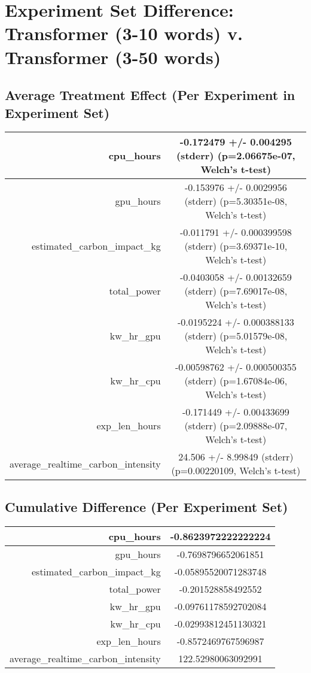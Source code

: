 \documentclass{article}%
\begin{document}
%
\normalsize%
\section{Experiment Set Difference: Transformer (3{-}10 words) v. Transformer (3{-}50 words)}%
\label{sec:Experiment Set Difference Transformer (3{-}10 words) v. Transformer (3{-}50 words)}%
\subsection{Average Treatment Effect (Per Experiment in Experiment Set)}%
\label{subsec:Average Treatment Effect (Per Experiment in Experiment Set)}%
\begin{tabular}{|r|c|}%
\hline%
cpu\_hours&{-}0.172479 +/{-} 0.004295 (stderr) (p=2.06675e{-}07, Welch's t{-}test)\\%
\hline%
gpu\_hours&{-}0.153976 +/{-} 0.0029956 (stderr) (p=5.30351e{-}08, Welch's t{-}test)\\%
\hline%
estimated\_carbon\_impact\_kg&{-}0.011791 +/{-} 0.000399598 (stderr) (p=3.69371e{-}10, Welch's t{-}test)\\%
\hline%
total\_power&{-}0.0403058 +/{-} 0.00132659 (stderr) (p=7.69017e{-}08, Welch's t{-}test)\\%
\hline%
kw\_hr\_gpu&{-}0.0195224 +/{-} 0.000388133 (stderr) (p=5.01579e{-}08, Welch's t{-}test)\\%
\hline%
kw\_hr\_cpu&{-}0.00598762 +/{-} 0.000500355 (stderr) (p=1.67084e{-}06, Welch's t{-}test)\\%
\hline%
exp\_len\_hours&{-}0.171449 +/{-} 0.00433699 (stderr) (p=2.09888e{-}07, Welch's t{-}test)\\%
\hline%
average\_realtime\_carbon\_intensity&24.506 +/{-} 8.99849 (stderr) (p=0.00220109, Welch's t{-}test)\\%
\hline%
\end{tabular}

%
\subsection{Cumulative Difference (Per Experiment Set)}%
\label{subsec:Cumulative Difference (Per Experiment Set)}%
\begin{tabular}{|r|c|}%
\hline%
cpu\_hours&{-}0.8623972222222224\\%
\hline%
gpu\_hours&{-}0.7698796652061851\\%
\hline%
estimated\_carbon\_impact\_kg&{-}0.05895520071283748\\%
\hline%
total\_power&{-}0.201528858492552\\%
\hline%
kw\_hr\_gpu&{-}0.09761178592702084\\%
\hline%
kw\_hr\_cpu&{-}0.02993812451130321\\%
\hline%
exp\_len\_hours&{-}0.8572469767596987\\%
\hline%
average\_realtime\_carbon\_intensity&122.52980063092991\\%
\hline%
\end{tabular}

%
\end{document}
